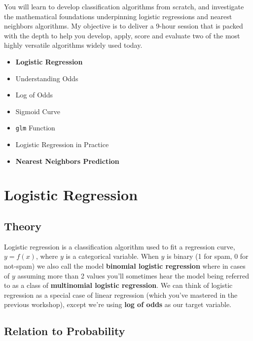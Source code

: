 \documentclass[
]{article}
\begin{document}
You will learn to develop classification algorithms from scratch, and
investigate the mathematical foundations underpinning logistic
regressions and nearest neighbors algorithms. My objective is to deliver
a 9-hour session that is packed with the depth to help you develop,
apply, score and evaluate two of the most highly versatile algorithms
widely used today.

\begin{itemize}
\item
  \textbf{Logistic Regression}
\item
  Understanding Odds\\
\item
  Log of Odds\\
\item
  Sigmoid Curve\\
\item
  \texttt{glm} Function\\
\item
  Logistic Regression in Practice
\item
  \textbf{Nearest Neighbors Prediction}
\end{itemize}

\hypertarget{logistic-regression}{%
\section{Logistic Regression}\label{logistic-regression}}

\hypertarget{theory}{%
\subsection{Theory}\label{theory}}

Logistic regression is a classification algorithm used to fit a
regression curve, \(y = f(x)\), where \(y\) is a categorical variable.
When \(y\) is binary (1 for spam, 0 for not-spam) we also call the model
\textbf{binomial logistic regression} where in cases of \(y\) assuming
more than 2 values you'll sometimes hear the model being referred to as
a class of \textbf{multinomial logistic regression}. We can think of
logistic regression as a special case of linear regression (which you've
mastered in the previous workshop), except we're using \textbf{log of
odds} as our target variable.

\hypertarget{relation-to-probability}{%
\subsection{Relation to Probability}\label{relation-to-probability}}
\end{document}
